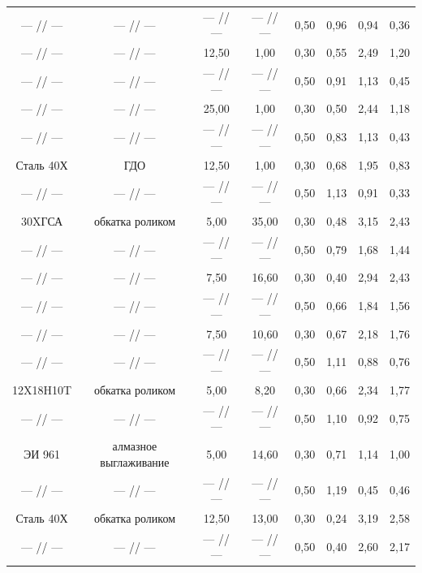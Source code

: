 \begin{table}[b!]
\begin{tabular}{c|c|c|c|c|c|c|c}
\footnotesize --- // --- &
\footnotesize --- // --- &
\footnotesize --- // --- &
\footnotesize --- // --- &0,50&0,96&0,94&0,36 \\
\footnotesize --- // --- &
\footnotesize --- // --- &12,50&1,00&0,30&0,55&2,49&1,20 \\
\footnotesize --- // --- &
\footnotesize --- // --- &
\footnotesize --- // --- &
\footnotesize --- // --- &0,50&0,91&1,13&0,45 \\
\footnotesize --- // --- &
\footnotesize --- // --- &25,00&1,00&0,30&0,50&2,44&1,18 \\
\footnotesize --- // --- &
\footnotesize --- // --- &
\footnotesize --- // --- &
\footnotesize --- // --- &0,50&0,83&1,13&0,43 \\
 Сталь  40Х &ГДО&12,50&1,00&0,30&0,68&1,95&0,83 \\
\footnotesize --- // --- & \footnotesize --- // --- & \footnotesize --- // --- & \footnotesize --- // --- &0,50&1,13&0,91&0,33 \\
30XГСА& обкатка  роликом &5,00&35,00&0,30&0,48&3,15&2,43 \\
\footnotesize --- // --- & \footnotesize --- // --- & \footnotesize --- // --- & \footnotesize --- // --- &0,50&0,79&1,68&1,44 \\
\footnotesize --- // --- & \footnotesize --- // --- &7,50&16,60&0,30&0,40&2,94&2,43 \\
\footnotesize --- // --- & \footnotesize --- // --- & \footnotesize --- // --- & \footnotesize --- // --- &0,50&0,66&1,84&1,56 \\
\footnotesize --- // --- & \footnotesize --- // --- &7,50&10,60&0,30&0,67&2,18&1,76 \\
\footnotesize --- // --- & \footnotesize --- // --- & \footnotesize --- // --- & \footnotesize --- // --- &0,50&1,11&0,88&0,76 \\
12X18H10T& обкатка  роликом &5,00&8,20&0,30&0,66&2,34&1,77 \\
\footnotesize --- // --- & \footnotesize --- // --- & \footnotesize --- // --- & \footnotesize --- // --- &0,50&1,10&0,92&0,75 \\
 ЭИ  961 & алмазное выглаживание &5,00&14,60&0,30&0,71&1,14&1,00 \\
\footnotesize --- // --- & \footnotesize --- // --- & \footnotesize --- // --- & \footnotesize --- // --- &0,50&1,19&0,45&0,46 \\
 Сталь  40Х & обкатка  роликом &12,50&13,00&0,30&0,24&3,19&2,58 \\
\footnotesize --- // --- & \footnotesize --- // --- & \footnotesize --- // --- & \footnotesize --- // --- &0,50&0,40&2,60&2,17 \\ \hline
\end{tabular}

\end{table}


